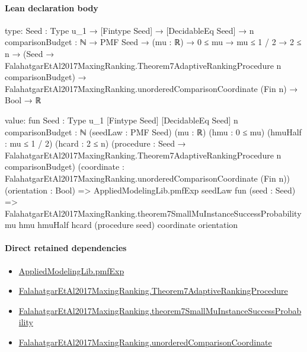 \documentclass[10pt]{article}
\begin{document}
\paragraph{Lean declaration body}
\begin{ReviewVerbatim}
type:
{Seed : Type u_1} →
  [Fintype Seed] →
    [DecidableEq Seed] →
      {n comparisonBudget : ℕ} →
        PMF Seed →
          (mu : ℝ) →
            0 ≤ mu →
              mu ≤ 1 / 2 →
                2 ≤ n →
                  (Seed → FalahatgarEtAl2017MaxingRanking.Theorem7AdaptiveRankingProcedure n comparisonBudget) →
                    FalahatgarEtAl2017MaxingRanking.unorderedComparisonCoordinate (Fin n) → Bool → ℝ

value:
fun {Seed : Type u_1} [Fintype Seed] [DecidableEq Seed] {n comparisonBudget : ℕ} (seedLaw : PMF Seed) (mu : ℝ)
    (hmu : 0 ≤ mu) (hmuHalf : mu ≤ 1 / 2) (hcard : 2 ≤ n)
    (procedure : Seed → FalahatgarEtAl2017MaxingRanking.Theorem7AdaptiveRankingProcedure n comparisonBudget)
    (coordinate : FalahatgarEtAl2017MaxingRanking.unorderedComparisonCoordinate (Fin n)) (orientation : Bool) =>
  AppliedModelingLib.pmfExp seedLaw fun (seed : Seed) =>
    FalahatgarEtAl2017MaxingRanking.theorem7SmallMuInstanceSuccessProbability mu hmu hmuHalf hcard (procedure seed)
      coordinate orientation
\end{ReviewVerbatim}

\paragraph{Direct retained dependencies}
\begin{itemize}\raggedright
\item \hyperlink{governing-declaration-8e4b4389a4f6454b}{Applied\allowbreak{}Modeling\allowbreak{}Lib.\allowbreak{}pmf\allowbreak{}Exp}
\item \hyperlink{governing-declaration-3610c7209777157b}{Falahatgar\allowbreak{}Et\allowbreak{}Al2017\allowbreak{}Maxing\allowbreak{}Ranking.\allowbreak{}Theorem7\allowbreak{}Adaptive\allowbreak{}Ranking\allowbreak{}Procedure}
\item \hyperlink{governing-declaration-31c043b1e1d258ed}{Falahatgar\allowbreak{}Et\allowbreak{}Al2017\allowbreak{}Maxing\allowbreak{}Ranking.\allowbreak{}theorem7\allowbreak{}Small\allowbreak{}Mu\allowbreak{}Instance\allowbreak{}Success\allowbreak{}Probability}
\item \hyperlink{governing-declaration-ef3a9f7f7c488790}{Falahatgar\allowbreak{}Et\allowbreak{}Al2017\allowbreak{}Maxing\allowbreak{}Ranking.\allowbreak{}unordered\allowbreak{}Comparison\allowbreak{}Coordinate}
\end{itemize}
\hypertarget{governing-declaration-b72dda6eba0cdd80}{}
\end{document}
